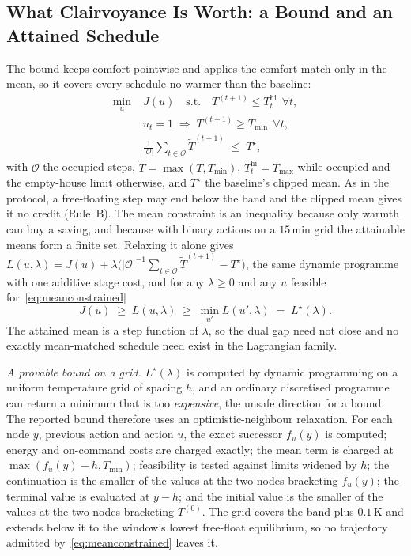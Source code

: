 \documentclass[3p,twocolumn,number]{elsarticle}
\newcommand{\Tmin}{T_{\min}}
\newcommand{\Tmax}{T_{\max}}
\begin{document}
\subsection{What Clairvoyance Is Worth: a Bound and an Attained Schedule}
\label{subsec:bound}

The bound keeps comfort pointwise and applies the comfort match only in the mean, so it covers every schedule no warmer than the baseline:
\begin{equation}
\begin{split}
  \min_{u}\;&J(u)\quad\text{s.t.}\quad
    T^{(t+1)}\le T^{\mathrm{hi}}_t\ \ \forall t,\\
  &u_t=1\;\Rightarrow\;T^{(t+1)}\ge\Tmin\ \ \forall t,\\
  &\tfrac{1}{|\mathcal{O}|}\textstyle\sum_{t\in\mathcal{O}}\tilde T^{(t+1)}
    \;\le\;T^{\star},
\end{split}
\label{eq:meanconstrained}
\end{equation}
with $\mathcal{O}$ the occupied steps, $\tilde T=\max(T,\Tmin)$, $T^{\mathrm{hi}}_t=\Tmax$ while occupied and the empty-house limit otherwise, and $T^{\star}$ the baseline's clipped mean. As in the protocol, a free-floating step may end below the band and the clipped mean gives it no credit (Rule~B). The mean constraint is an inequality because only warmth can buy a saving, and because with binary actions on a $15\,$min grid the attainable means form a finite set. Relaxing it alone gives $L(u,\lambda)=J(u)+\lambda\bigl(|\mathcal{O}|^{-1}\sum_{t\in\mathcal{O}}\tilde T^{(t+1)}-T^{\star}\bigr)$, the same dynamic programme with one additive stage cost, and for any $\lambda\ge0$ and any $u$ feasible for~\eqref{eq:meanconstrained}
\begin{equation}
  J(u)\;\ge\;L(u,\lambda)\;\ge\;\min_{u'}L(u',\lambda)\;=\;L^{\star}(\lambda).
  \label{eq:dual_bound}
\end{equation}
The attained mean is a step function of $\lambda$, so the dual gap need not close and no exactly mean-matched schedule need exist in the Lagrangian family.

\emph{A provable bound on a grid.} $L^{\star}(\lambda)$ is computed by dynamic programming on a uniform temperature grid of spacing $h$, and an ordinary discretised programme can return a minimum that is too \emph{expensive}, the unsafe direction for a bound. The reported bound therefore uses an optimistic-neighbour relaxation. For each node $y$, previous action and action $u$, the exact successor $f_u(y)$ is computed; energy and on-command costs are charged exactly; the mean term is charged at $\max(f_u(y)-h,\Tmin)$; feasibility is tested against limits widened by $h$; the continuation is the smaller of the values at the two nodes bracketing $f_u(y)$; the terminal value is evaluated at $y-h$; and the initial value is the smaller of the values at the two nodes bracketing $T^{(0)}$. The grid covers the band plus $0.1\,$K and extends below it to the window's lowest free-float equilibrium, so no trajectory admitted by~\eqref{eq:meanconstrained} leaves it.
\end{document}
